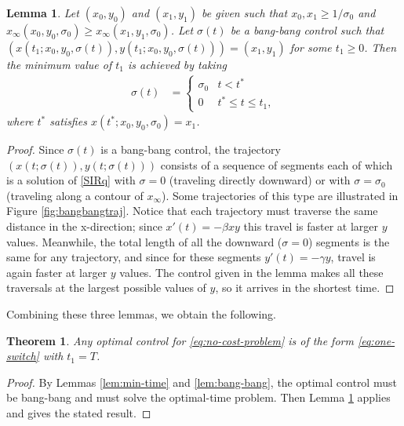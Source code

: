 \documentclass[english,12pt,letter]{article}
\newtheorem{thm}{Theorem}
\newtheorem{lem}{Lemma}
\newcommand{\Rnot}{\sigma_0}
\newcommand{\Sinf}{x_\infty}
\begin{document}
\begin{lem} \label{lem:shortest-path}
Let $(x_0,y_0)$ and $(x_1,y_1)$ be given such that $x_0, x_1 \ge 1/\Rnot$ and
$\Sinf(x_0,y_0,\Rnot)\ge\Sinf(x_1,y_1,\Rnot)$.
Let $\sigma(t)$ be a bang-bang control such that $(x(t_1;x_0,y_0,\sigma(t)),y(t_1;x_0,y_0,\sigma(t)))=(x_1,y_1)$
for some $t_1\ge0$.  Then the minimum value of $t_1$ is achieved by taking
\begin{align} \label{eq:one-switch}
    \sigma(t) & = \begin{cases}
        \Rnot & t<t^* \\
        0 & t^* \le  t \le t_1,
    \end{cases}
\end{align}
where $t^*$ satisfies $x(t^*;x_0,y_0,\Rnot)=x_1$.
\end{lem}
\begin{proof}
Since $\sigma(t)$ is a bang-bang control, the trajectory $(x(t;\sigma(t)),y(t;\sigma(t)))$ 
consists of a sequence of segments each of which is a solution of
\eqref{SIRq} with $\sigma=0$ (traveling directly downward) or with $\sigma=\sigma_0$
(traveling along a contour of $x_\infty$).  Some trajectories of this type are
illustrated in Figure \ref{fig:bangbangtraj}.  Notice that each trajectory must
traverse the same distance in the x-direction; since $x'(t)=-\beta xy$ this
travel is faster at larger $y$ values.  Meanwhile, the total length of all the
downward ($\sigma=0$) segments is the same for any trajectory, and since for
these segments $y'(t) = -\gamma y$, travel is again faster at larger $y$ values.
The control given in the lemma makes all these traversals at the largest
possible values of $y$, so it arrives in the shortest time.
\end{proof}

Combining these three lemmas, we obtain the following.
\begin{thm} \label{thm:one-switch}
    Any optimal control for \eqref{eq:no-cost-problem} is of the form \eqref{eq:one-switch}
    with $t_1=T$.
\end{thm}
\begin{proof}
    By Lemmas \ref{lem:min-time} and \ref{lem:bang-bang}, the optimal control must be bang-bang and must solve
    the optimal-time problem.  Then Lemma \ref{lem:shortest-path} applies and gives the stated result.
\end{proof}
\end{document}
